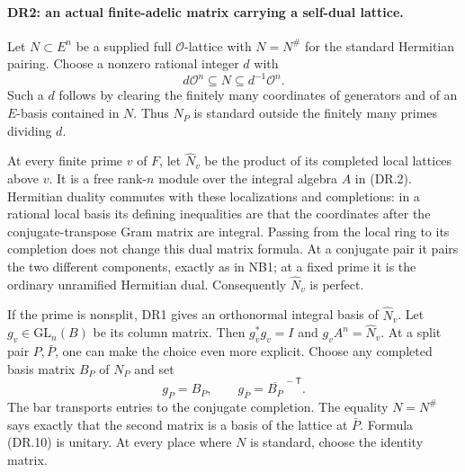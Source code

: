 \paragraph{DR2: an actual finite-adelic matrix carrying a self-dual lattice.}
Let $N\subset E^n$ be a supplied full $\mathcal O$-lattice with
$N=N^\#$ for the standard Hermitian pairing. Choose a nonzero
rational integer $d$ with
\[
                 d\mathcal O^n\subseteq N
                         \subseteq d^{-1}\mathcal O^n.
 \tag{DR.9}
\]
Such a $d$ follows by clearing the finitely many coordinates of
generators and of an $E$-basis contained in $N$. Thus $N_P$ is
standard outside the finitely many primes dividing $d$.

At every finite prime $v$ of $F$, let $\widehat N_v$ be the product
of its completed local lattices above $v$. It is a free rank-$n$
module over the integral algebra $A$ in (DR.2). Hermitian duality
commutes with these localizations and completions: in a rational
local basis its defining inequalities are that the coordinates
after the conjugate-transpose Gram matrix are integral. Passing
from the local ring to its completion does not change this dual
matrix formula. At a conjugate pair it pairs the two different
components, exactly as in NB1; at a fixed prime it is the ordinary
unramified Hermitian dual. Consequently $\widehat N_v$ is perfect.

If the prime is nonsplit, DR1 gives an orthonormal integral basis
of $\widehat N_v$. Let $g_v\in\mathrm{GL}_n(B)$ be its column
matrix. Then $g_v^*g_v=I$ and $g_v A^n=\widehat N_v$.
At a split pair $P,\bar P$, one can make the choice even more
explicit. Choose any completed basis matrix $B_P$ of $N_P$ and set
\[
              g_P=B_P,\qquad
              g_{\bar P}=\overline{B_P}^{\,-\mathsf T}.
 \tag{DR.10}
\]
The bar transports entries to the conjugate completion.
The equality $N=N^\#$ says exactly that the second matrix is
a basis of the lattice at $\bar P$. Formula (DR.10) is unitary.
At every place where $N$ is standard, choose the identity matrix.

